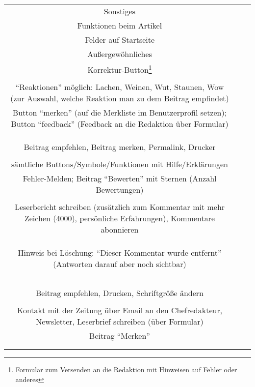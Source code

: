\begin{landscape}
\begin{tabular}{ccc}
{		\\ \hline

		
Sonstiges\\ 
Funktionen beim Artikel\\
Felder auf Startseite\\
Außergewöhnliches
&		%
		\\
		Korrektur-Button\footnote{Formular zum Versenden an die Redaktion mit Hinweisen auf Fehler oder anderes}\\
		\\
		``Reaktionen'' möglich: Lachen, Weinen, Wut, Staunen, Wow (zur Auswahl, welche Reaktion man zu dem Beitrag empfindet)
		&
		\\
		Button ``merken'' (auf die Merkliste im Benutzerprofil setzen); Button ``feedback'' (Feedback an die Redaktion über Formular) \\
		\\
		\\
		&
		\\
		Beitrag empfehlen, Beitrag merken, Permalink, Drucker\\
		\\
		sämtliche Buttons/Symbole/Funktionen mit Hilfe/Erklärungen
		&
		\\
		Fehler-Melden; Beitrag ``Bewerten'' mit Sternen (Anzahl Bewertungen)\\
		\\
		Leserbericht schreiben (zusätzlich zum Kommentar mit mehr Zeichen (4000), persönliche Erfahrungen), Kommentare abonnieren\\
		&
		\\
		\\
		\\
		Hinweis bei Löschung: ``Dieser Kommentar wurde entfernt'' (Antworten darauf aber noch sichtbar)\\
		&
		\\
		\\
		\\
		\\
		&
		\\
		Beitrag empfehlen, Drucken, Schriftgröße ändern\\
		\\
		Kontakt mit der Zeitung über Email an den Chefredakteur, Newsletter, Leserbrief schreiben (über Formular)
		&
		\\
		Beitrag ``Merken''\\
		\\
}
\end{tabular}
\end{landscape}
